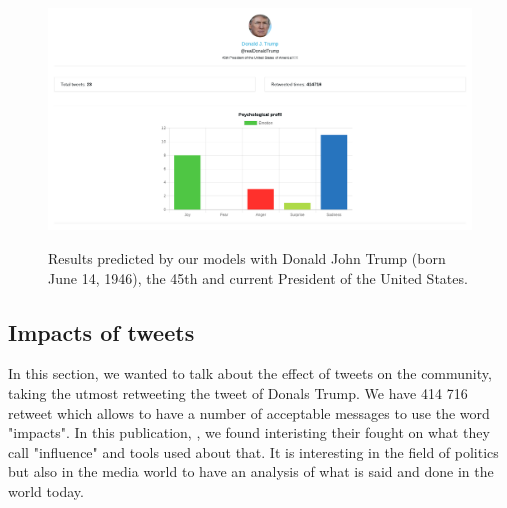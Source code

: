 \documentclass{acmtog} %
\begin{document}
\begin{figure}[h!]
{\includegraphics[width=\linewidth]{Trump-results-analysis_exemple.png}}
\caption{Results predicted by our models with Donald John Trump (born June 14, 1946), the 45th and current President of the United States.}
  \label{fig:trump_results}
\end{figure}


\subsection{Impacts of tweets}
\label{subsub:impacts_tweets}

In this section, we wanted to talk about the effect of tweets on the community, taking the utmost retweeting the tweet of Donals Trump. We have 414 716 retweet which allows to have a number of acceptable messages to use the word "impacts". In this publication, \cite{Vyas17}, we found interisting their fought on what they call "influence" and tools used about that. It is interesting in the field of politics but also in the media world to have an analysis of what is said and done in the world today.
\end{document}
